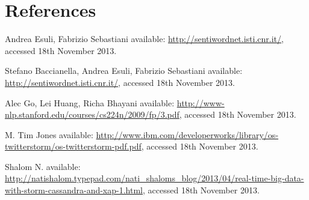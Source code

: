 \documentclass[a4paper]{article}
\begin{document}
\section{References}




\begin{thebibliography}{20}

	Andrea Esuli, Fabrizio Sebastiani
	\newblock available: \url{http://sentiwordnet.isti.cnr.it/}, accessed 18th November 2013.
	
	Stefano Baccianella, Andrea Esuli, Fabrizio Sebastiani
	\newblock available: \url{http://sentiwordnet.isti.cnr.it/}, accessed 18th November 2013.
	
	Alec Go, Lei Huang, Richa Bhayani
	\newblock available: \url{http://www-nlp.stanford.edu/courses/cs224n/2009/fp/3.pdf}, accessed 18th November 2013.
	
	M. Tim Jones
	\newblock available: \url{http://www.ibm.com/developerworks/library/os-twitterstorm/os-twitterstorm-pdf.pdf}, accessed 18th November 2013.
	
	Shalom N. 
	\newblock available: \url{http://natishalom.typepad.com/nati_shaloms_blog/2013/04/real-time-big-data-with-storm-cassandra-and-xap-1.html}, accessed 18th November 2013.
	
	\newblock{}
	\newblock{}
	
		
\end{thebibliography}
\end{document}
